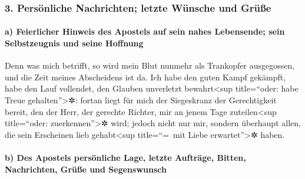 \hypertarget{persuxf6nliche-nachrichten-letzte-wuxfcnsche-und-gruxfcuxdfe}{%
\subsubsection{3. Persönliche Nachrichten; letzte Wünsche und
Grüße}\label{persuxf6nliche-nachrichten-letzte-wuxfcnsche-und-gruxfcuxdfe}}

\hypertarget{a-feierlicher-hinweis-des-apostels-auf-sein-nahes-lebensende-sein-selbstzeugnis-und-seine-hoffnung}{%
\paragraph{a) Feierlicher Hinweis des Apostels auf sein nahes
Lebensende; sein Selbstzeugnis und seine
Hoffnung}\label{a-feierlicher-hinweis-des-apostels-auf-sein-nahes-lebensende-sein-selbstzeugnis-und-seine-hoffnung}}

 Denn was mich betrifft, so wird mein Blut nunmehr als
Trankopfer ausgegossen, und die Zeit meines Abscheidens ist da.
 Ich habe den guten Kampf gekämpft, habe den Lauf
vollendet, den Glauben unverletzt bewahrt\textless sup title=``oder:
habe Treue gehalten''\textgreater✲:  fortan liegt für mich
der Siegeskranz der Gerechtigkeit bereit, den der Herr, der gerechte
Richter, mir an jenem Tage zuteilen\textless sup title=``oder:
zuerkennen''\textgreater✲ wird; jedoch nicht nur mir, sondern überhaupt
allen, die sein Erscheinen lieb gehabt\textless sup title=``=~mit Liebe
erwartet''\textgreater✲ haben.

\hypertarget{b-des-apostels-persuxf6nliche-lage-letzte-auftruxe4ge-bitten-nachrichten-gruxfcuxdfe-und-segenswunsch}{%
\paragraph{b) Des Apostels persönliche Lage, letzte Aufträge, Bitten,
Nachrichten, Grüße und
Segenswunsch}\label{b-des-apostels-persuxf6nliche-lage-letzte-auftruxe4ge-bitten-nachrichten-gruxfcuxdfe-und-segenswunsch}}

